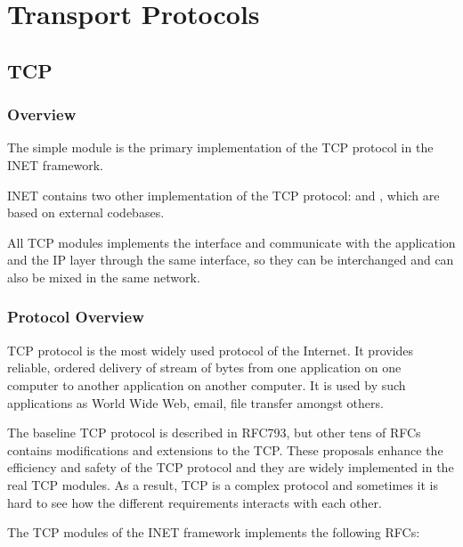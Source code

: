 \chapter{Transport Protocols}
\label{cha:transport-protocols}

\section{TCP}
\label{sec:tcp}

\subsection{Overview}
\label{sec:tcp_overview}

The  simple module is the primary implementation 
of the TCP protocol in the INET framework.

INET contains two other implementation of the TCP protocol:
 and , which are based
on external codebases.

All TCP modules implements the  interface and
communicate with the application and the IP layer through the
same interface, so they can be interchanged and can also be 
mixed in the same network.

\subsection{Protocol Overview}
\label{sec:tcp_prot}

TCP protocol is the most widely used protocol of the Internet. It provides
reliable, ordered delivery of stream of bytes from one application on one computer
to another application on another computer. It is used by such applications as
World Wide Web, email, file transfer amongst others.

The baseline TCP protocol is described in RFC793, but other tens of RFCs
contains modifications and extensions to the TCP. These proposals
enhance the efficiency and safety of the TCP protocol and they are widely
implemented in the real TCP modules. As a result, TCP is a complex protocol
and sometimes it is hard to see how the different requirements interacts
with each other.

The TCP modules of the INET framework implements the following RFCs:

